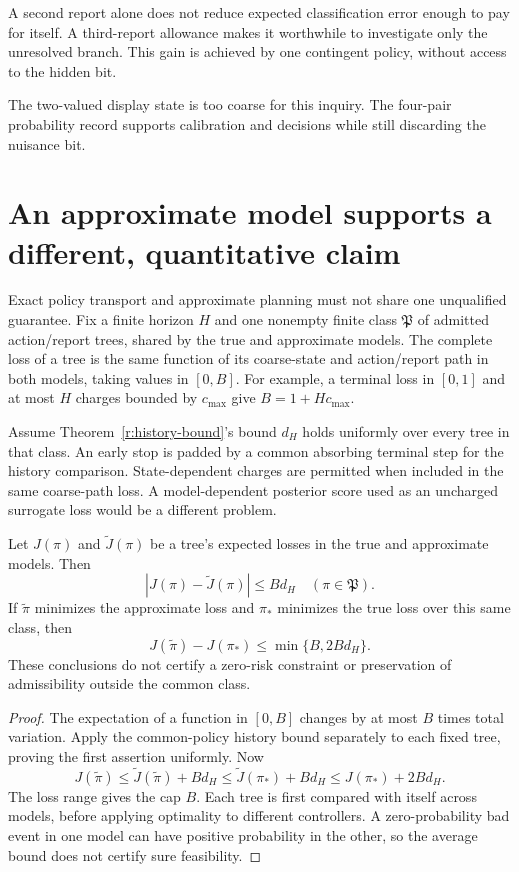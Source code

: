 A second report alone does not reduce expected classification error enough to pay for itself. A third-report allowance makes it worthwhile to investigate only the unresolved branch. This gain is achieved by one contingent policy, without access to the hidden bit.



The two-valued display state is too coarse for this inquiry. The four-pair probability record supports calibration and decisions while still discarding the nuisance bit.

\section{An approximate model supports a different, quantitative claim}
Exact policy transport and approximate planning must not share one unqualified guarantee. Fix a finite horizon $H$ and one nonempty finite class $\mathfrak P$ of admitted action/report trees, shared by the true and approximate models. The complete loss of a tree is the same function of its coarse-state and action/report path in both models, taking values in $[0,B]$. For example, a terminal loss in $[0,1]$ and at most $H$ charges bounded by $c_{\max}$ give $B=1+Hc_{\max}$.

Assume Theorem~\ref{r:history-bound}'s bound $d_H$ holds uniformly over every tree in that class. An early stop is padded by a common absorbing terminal step for the history comparison. State-dependent charges are permitted when included in the same coarse-path loss. A model-dependent posterior score used as an uncharged surrogate loss would be a different problem.

\begin{proposition}\label{r:policy-error}
Let $J(\pi)$ and $\widetilde J(\pi)$ be a tree's expected losses in the true and approximate models. Then
\[
 |J(\pi)-\widetilde J(\pi)|\le Bd_H\quad(\pi\in\mathfrak P).
\]
If $\widetilde\pi$ minimizes the approximate loss and $\pi_*$ minimizes the true loss over this same class, then
\[
 J(\widetilde\pi)-J(\pi_*)\le\min\{B,2Bd_H\}.
\]
These conclusions do not certify a zero-risk constraint or preservation of admissibility outside the common class.
\end{proposition}
\begin{proof}
The expectation of a function in $[0,B]$ changes by at most $B$ times total variation. Apply the common-policy history bound separately to each fixed tree, proving the first assertion uniformly. Now
\[
 J(\widetilde\pi)\le\widetilde J(\widetilde\pi)+Bd_H
 \le\widetilde J(\pi_*)+Bd_H\le J(\pi_*)+2Bd_H.
\]
The loss range gives the cap $B$. Each tree is first compared with itself across models, before applying optimality to different controllers. A zero-probability bad event in one model can have positive probability in the other, so the average bound does not certify sure feasibility.
\end{proof}

